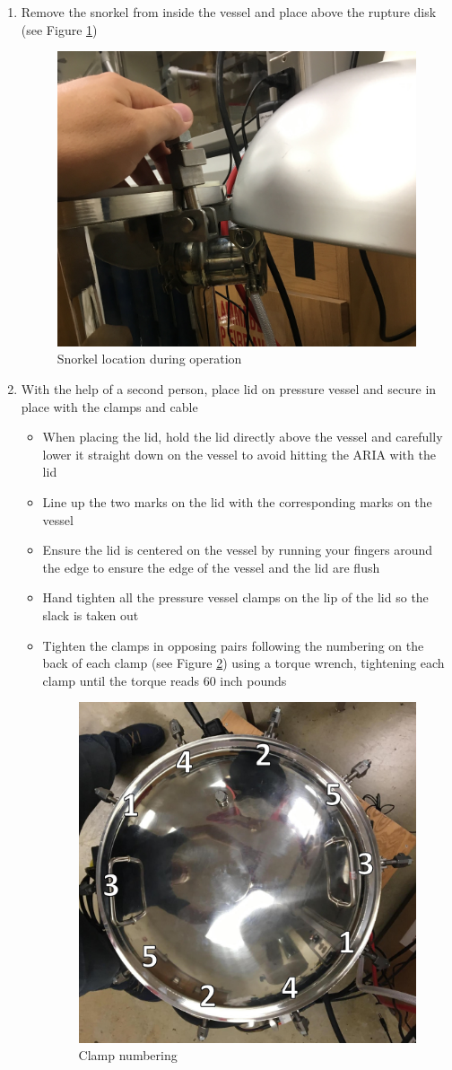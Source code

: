 \documentclass[letterpaper,11pt]{article}
\begin{document}
\begin{enumerate}
    \item Remove the snorkel from inside the vessel and place above the rupture disk
        (see Figure \ref{fig:rupture_hood})
        
\begin{figure}[H]
\centering\includegraphics[width=.3\textwidth]{rupture_hood.jpg}
\caption{Snorkel location during operation}
\label{fig:rupture_hood}
\end{figure}

	
	\item With the help of a second person, place lid on pressure vessel and secure in place with the 
        clamps and cable
		\begin{itemize}
        \item When placing the lid, hold the lid directly above the vessel and 
            carefully lower it straight down on the vessel to avoid hitting the
            ARIA with the lid
        \item Line up the two marks on the lid with the corresponding marks 
            on the vessel
        \item Ensure the lid is centered on the vessel by running your fingers
            around the edge to ensure the edge of the vessel and the lid are
            flush 
		\item Hand tighten all the pressure vessel clamps on the lip of the lid so 
            the slack is taken out
        \item Tighten the clamps in opposing pairs following the numbering on 
			the back of each clamp (see Figure \ref{fig:Top_of_lid}) using a torque wrench, tightening each clamp until the torque reads 60 inch pounds
 
\begin{figure}[H]
\centering
\includegraphics[width=.35\textwidth]{Top_of_lid.jpg}
\caption{Clamp numbering}
\label{fig:Top_of_lid}
\end{figure}
         

\end{itemize}
\end{enumerate}
\end{document}
